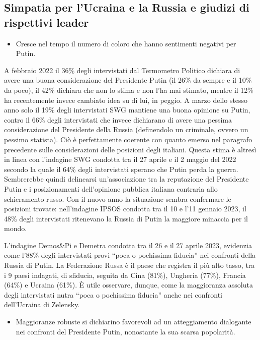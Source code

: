 \documentclass[
]{book}
\providecommand{\tightlist}{%
  \setlength{\itemsep}{0pt}\setlength{\parskip}{0pt}}
\begin{document}
\hypertarget{simpatia-per-lucraina-e-la-russia-e-giudizi-di-rispettivi-leader}{%
\subsection{Simpatia per l'Ucraina e la Russia e giudizi di rispettivi leader}\label{simpatia-per-lucraina-e-la-russia-e-giudizi-di-rispettivi-leader}}

\begin{itemize}
\tightlist
\item
  Cresce nel tempo il numero di coloro che hanno sentimenti negativi per Putin.
\end{itemize}

A febbraio 2022 il 36\% degli intervistati dal Termometro Politico dichiara di avere una buona considerazione del Presidente Putin (il 26\% da sempre e il 10\% da poco), il 42\% dichiara che non lo stima e non l'ha mai stimato, mentre il 12\% ha recentemente invece cambiato idea su di lui, in peggio. A marzo dello stesso anno solo il 19\% degli intervistati SWG mantiene una buona opinione su Putin, contro il 66\% degli intervistati che invece dichiarano di avere una pessima considerazione del Presidente della Russia (definendolo un criminale, ovvero un pessimo statista). Ciò è perfettamente coerente con quanto emerso nel paragrafo precedente sulle considerazioni delle posizioni degli italiani. Questa stima è altresì in linea con l'indagine SWG condotta tra il 27 aprile e il 2 maggio del 2022 secondo la quale il 64\% degli intervistati sperano che Putin perda la guerra. Sembrerebbe quindi delinearsi un'associazione tra la reputazione del Presidente Putin e i posizionamenti dell'opinione pubblica italiana contraria allo schieramento russo. Con il nuovo anno la situazione sembra confermare le posizioni trovate: nell'indagine IPSOS condotta tra il 10 e l'11 gennaio 2023, il 48\% degli intervistati ritenevano la Russia di Putin la maggiore minaccia per il mondo.

L'indagine Demos\&Pi e Demetra condotta tra il 26 e il 27 aprile 2023, evidenzia come l'88\% degli intervistati provi ``poca o pochissima fiducia'' nei confronti della Russia di Putin. La Federazione Russa è il paese che registra il più alto tasso, tra i 9 paesi indagati, di sfiducia, seguita da Cina (81\%), Ungheria (77\%), Francia (64\%) e Ucraina (61\%). È utile osservare, dunque, come la maggioranza assoluta degli intervistati nutra ``poca o pochissima fiducia'' anche nei confronti dell'Ucraina di Zelensky.

\begin{itemize}
\tightlist
\item
  Maggioranze robuste si dichiarino favorevoli ad un atteggiamento dialogante nei confronti del Presidente Putin, nonostante la sua scarsa popolarità.
\end{itemize}
\end{document}
